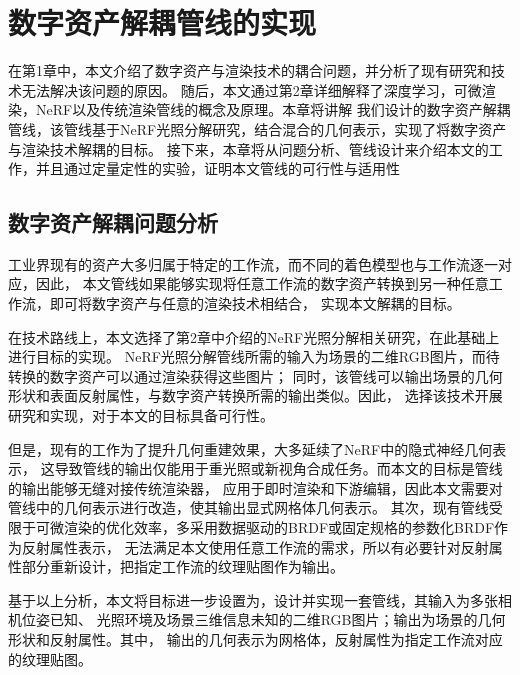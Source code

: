 
\chapter{数字资产解耦管线的实现}

在第1章中，本文介绍了数字资产与渲染技术的耦合问题，并分析了现有研究和技术无法解决该问题的原因。
随后，本文通过第2章详细解释了深度学习，可微渲染，NeRF以及传统渲染管线的概念及原理。本章将讲解
我们设计的数字资产解耦管线，该管线基于NeRF光照分解研究，结合混合的几何表示，实现了将数字资产与渲染技术解耦的目标。
接下来，本章将从问题分析、管线设计来介绍本文的工作，并且通过定量定性的实验，证明本文管线的可行性与适用性

\section{数字资产解耦问题分析}

工业界现有的资产大多归属于特定的工作流，而不同的着色模型也与工作流逐一对应，因此，
本文管线如果能够实现将任意工作流的数字资产转换到另一种任意工作流，即可将数字资产与任意的渲染技术相结合，
实现本文解耦的目标。

在技术路线上，本文选择了第2章中介绍的NeRF光照分解相关研究，在此基础上进行目标的实现。
NeRF光照分解管线所需的输入为场景的二维RGB图片，而待转换的数字资产可以通过渲染获得这些图片；
同时，该管线可以输出场景的几何形状和表面反射属性，与数字资产转换所需的输出类似。因此，
选择该技术开展研究和实现，对于本文的目标具备可行性。

但是，现有的工作为了提升几何重建效果，大多延续了NeRF中的隐式神经几何表示，
这导致管线的输出仅能用于重光照或新视角合成任务。而本文的目标是管线的输出能够无缝对接传统渲染器，
应用于即时渲染和下游编辑，因此本文需要对管线中的几何表示进行改造，使其输出显式网格体几何表示。
其次，现有管线受限于可微渲染的优化效率，多采用数据驱动的BRDF或固定规格的参数化BRDF作为反射属性表示，
无法满足本文使用任意工作流的需求，所以有必要针对反射属性部分重新设计，把指定工作流的纹理贴图作为输出。

基于以上分析，本文将目标进一步设置为，设计并实现一套管线，其输入为多张相机位姿已知、
光照环境及场景三维信息未知的二维RGB图片；输出为场景的几何形状和反射属性。其中，
输出的几何表示为网格体，反射属性为指定工作流对应的纹理贴图。


